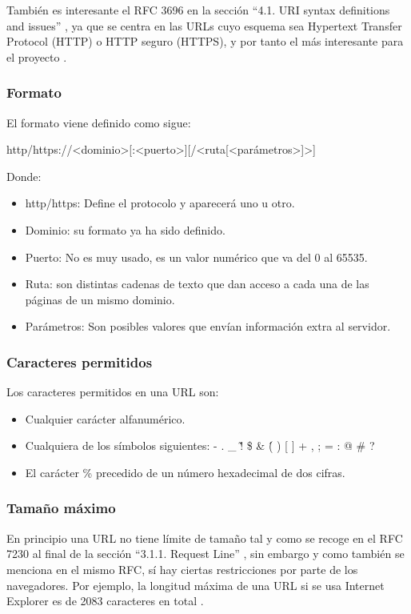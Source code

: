También es interesante el RFC 3696 en la sección “4.1.  URI syntax definitions and issues” \cite{rfc3696_section4_1}, ya que se centra en las URLs cuyo esquema sea Hypertext Transfer Protocol (HTTP) o HTTP seguro (HTTPS), y por tanto el más interesante para el proyecto .

\subsubsection{Formato}
El formato viene definido como sigue: 

{http/https}://<dominio>[:<puerto>][/<ruta[<parámetros>]>]

Donde:
\begin{itemize}
    \item http/https: Define el protocolo y aparecerá uno u otro. 
    \item Dominio: su formato ya ha sido definido.
    \item Puerto: No es muy usado, es un valor numérico que va del 0 al 65535.
    \item Ruta: son distintas cadenas de texto que dan acceso a cada una de las páginas de un mismo dominio.
    \item Parámetros: Son posibles valores que envían información extra al servidor. 
\end{itemize}

\subsubsection{Caracteres permitidos}
Los caracteres permitidos en una URL son:
\begin{itemize}
    \item Cualquier carácter alfanumérico.
    \item Cualquiera de los símbolos siguientes: - . \_ \~ ! \$ \& \' ( ) [ ] \* + , ; = : @ \# ? \/
    \item El carácter \% precedido de un número hexadecimal de dos cifras. 
\end{itemize}

\subsubsection{Tamaño máximo}
En principio una URL no tiene límite de tamaño tal y como se recoge en el RFC 7230 al final de la sección “3.1.1.  Request Line” \cite{rfc7230_section_3_1_1}, sin embargo y como también se menciona en el mismo RFC, sí hay ciertas restricciones por parte de los navegadores. Por ejemplo, la longitud máxima de una URL si se usa Internet Explorer es de 2083 caracteres en total \cite{maximum_url_length}.

